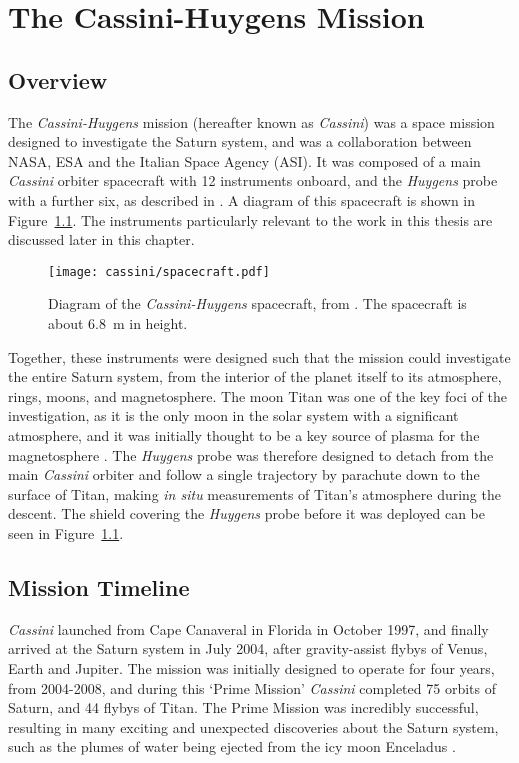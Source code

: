 \chapter{The Cassini-Huygens Mission}
\label{chap:cassini}
\section{Overview}
The \textit{Cassini-Huygens} mission (hereafter known as \textit{Cassini}) was a space mission designed to investigate the Saturn system, and was a collaboration between NASA, ESA and the Italian Space Agency (ASI). It was composed of a main \textit{Cassini} orbiter spacecraft with 12 instruments onboard, and the \textit{Huygens} probe with a further six, as described in \citet{matson2002}. A diagram of this spacecraft is shown in Figure~\ref{cassini:fig:spacecraft}. The instruments particularly relevant to the work in this thesis are discussed later in this chapter. 

\begin{figure}
\centering
\noindent\texttt{[image: cassini/spacecraft.pdf]}
\caption[Diagram of the \textit{Cassini-Huygens} spacecraft]{Diagram of the \textit{Cassini-Huygens} spacecraft, from \citet{narvaez2004}. The spacecraft is about \SI{6.8}{m} in height.}
\label{cassini:fig:spacecraft}
\end{figure}

Together, these instruments were designed such that the mission could investigate the entire Saturn system, from the interior of the planet itself to its atmosphere, rings, moons, and magnetosphere. The moon Titan was one of the key foci of the investigation, as it is the only moon in the solar system with a significant atmosphere, and it was initially thought to be a key source of plasma for the magnetosphere \citep{smith2004}. The \textit{Huygens} probe was therefore designed to detach from the main \textit{Cassini} orbiter and follow a single trajectory by parachute down to the surface of Titan, making \textit{in situ} measurements of Titan's atmosphere during the descent. The shield covering the \textit{Huygens} probe before it was deployed can be seen in Figure~\ref{cassini:fig:spacecraft}.

\section{Mission Timeline}
\textit{Cassini} launched from Cape Canaveral in Florida in October 1997, and finally arrived at the Saturn system in July 2004, after gravity-assist flybys of Venus, Earth and Jupiter. The mission was initially designed to operate for four years, from 2004-2008, and during this `Prime Mission' \textit{Cassini} completed 75 orbits of Saturn, and 44 flybys of Titan. The Prime Mission was incredibly successful, resulting in many exciting and unexpected discoveries about the Saturn system, such as the plumes of water being ejected from the icy moon Enceladus \citep{dougherty2006}. 

